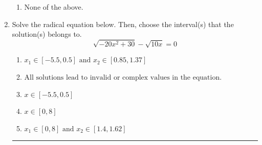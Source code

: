 \documentclass[14pt]{extbook}
\newcommand{\litem}[1]{\item#1\hspace*{-1cm}\rule{\textwidth}{0.4pt}}
\begin{document}
\begin{enumerate}
{\begin{enumerate}[label=\Alph*.]
\item None of the above.
\end{enumerate} }
\litem{
Solve the radical equation below. Then, choose the interval(s) that the solution(s) belongs to.\[ \sqrt{-20 x^2 + 30} - \sqrt{10 x} = 0 \]\begin{enumerate}[label=\Alph*.]
\item \( x_1 \in [-5.5, 0.5] \text{ and } x_2 \in [0.85,1.37] \)
\item \( \text{All solutions lead to invalid or complex values in the equation.} \)
\item \( x \in [-5.5,0.5] \)
\item \( x \in [0,8] \)
\item \( x_1 \in [0, 8] \text{ and } x_2 \in [1.4,1.62] \)


\end{enumerate}}
\end{enumerate}
\end{document}
